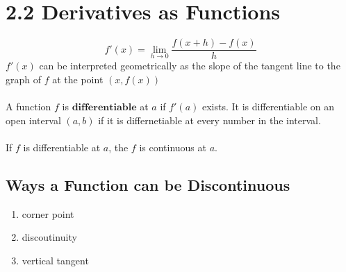 %
%

\section*{2.2 Derivatives as Functions}

$$f'(x)=\lim_{h \to 0}\frac{f(x+h)-f(x)}{h}$$
\(f'(x)\) can be interpreted geometrically as the slope of the tangent line to the graph of \(f\) at the point \((x, f(x))\)
\\\\
A function \(f\) is \(\textbf{differentiable}\) at \(a\) if \(f'(a)\) exists. It is differentiable on an open interval \((a,b)\) if it is differnetiable at every number in the interval.
\\\\
If \(f\) is differentiable at \(a\), the \(f\) is continuous at \(a\).

\subsection*{Ways a Function can be Discontinuous}

\begin{enumerate}
    \item corner point
    \item discoutinuity
    \item vertical tangent
\end{enumerate}

